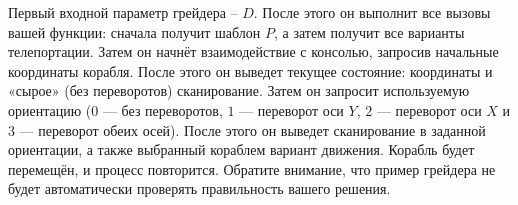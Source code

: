 \documentclass[12pt]{article}
\begin{document}
Первый входной параметр грейдера -- $D$. После этого он выполнит все вызовы вашей функции: сначала получит шаблон $P$, а затем получит все варианты телепортации. Затем он начнёт взаимодействие с консолью, запросив начальные координаты корабля. После этого он выведет текущее состояние: координаты и «сырое» (без переворотов) сканирование. Затем он запросит используемую ориентацию ($0$ — без переворотов, $1$ — переворот оси $Y$, $2$ — переворот оси $X$ и $3$ — переворот обеих осей). После этого он выведет сканирование в заданной ориентации, а также выбранный кораблем вариант движения. Корабль будет перемещён, и процесс повторится. Обратите внимание, что пример грейдера не будет автоматически проверять правильность вашего решения.
\end{document}
